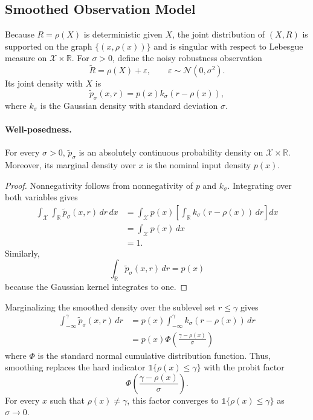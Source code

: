 \subsection{Smoothed Observation Model}
\label{app:smoothed-observation}

Because $R=\rho(X)$ is deterministic given $X$, the joint distribution of $(X,R)$ is supported on the graph $\{(x,\rho(x))\}$ and is singular with respect to Lebesgue measure on $\mathcal X\times\mathbb R$. For $\sigma>0$, define the noisy robustness observation
\[
    \tilde R
    =
    \rho(X)+\varepsilon,
    \qquad
    \varepsilon\sim\mathcal N(0,\sigma^2).
\]
Its joint density with $X$ is
\[
    \tilde p_\sigma(x,r)
    =
    p(x)k_\sigma(r-\rho(x)),
\]
where $k_\sigma$ is the Gaussian density with standard deviation $\sigma$.

\paragraph{Well-posedness.}
For every $\sigma>0$, $\tilde p_\sigma$ is an absolutely continuous probability density on $\mathcal X\times\mathbb R$. Moreover, its marginal density over $x$ is the nominal input density $p(x)$.
\vspace{0.3cm}

\begin{proof}
Nonnegativity follows from nonnegativity of $p$ and $k_\sigma$. Integrating over both variables gives
\[
\begin{aligned}
    \int_{\mathcal X}\int_{\mathbb R}
    \tilde p_\sigma(x,r)\,dr\,dx
    &=
    \int_{\mathcal X}
    p(x)
    \left[
        \int_{\mathbb R}
        k_\sigma(r-\rho(x))\,dr
    \right]dx \\
    &=
    \int_{\mathcal X}p(x)\,dx \\
    &=1.
\end{aligned}
\]
Similarly,
\[
    \int_{\mathbb R}
    \tilde p_\sigma(x,r)\,dr
    =
    p(x)
\]
because the Gaussian kernel integrates to one.
\end{proof}

Marginalizing the smoothed density over the sublevel set $r\leq\gamma$ gives
\[
\begin{aligned}
    \int_{-\infty}^{\gamma}
    \tilde p_\sigma(x,r)\,dr
    &=
    p(x)
    \int_{-\infty}^{\gamma}
    k_\sigma(r-\rho(x))\,dr \\
    &=
    p(x)
    \Phi\!\left(
        \frac{\gamma-\rho(x)}{\sigma}
    \right)
\end{aligned}
\]
where $\Phi$ is the standard normal cumulative distribution function. Thus, smoothing replaces the hard indicator $\mathds{1}\{\rho(x)\leq\gamma\}$ with the probit factor
\[
    \Phi\!\left(
        \frac{\gamma-\rho(x)}{\sigma}
    \right).
\]
For every $x$ such that $\rho(x)\neq\gamma$, this factor converges to $\mathds{1}\{\rho(x)\leq\gamma\}$ as $\sigma\to0$.

